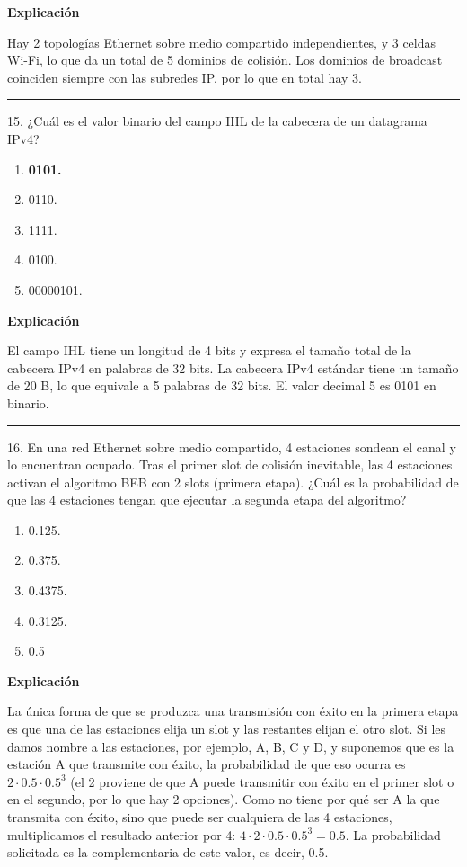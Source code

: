 \documentclass[10pt,a4paper]{article}
\begin{document}
\textbf{Explicación}

Hay 2 topologías Ethernet sobre medio compartido independientes, y 3 celdas Wi-Fi, lo que da un total de 5 dominios de colisión. Los dominios de broadcast coinciden siempre con las subredes IP, por lo que en total hay 3.

\vspace{15pt} \hrule \vspace{15pt}





15. ¿Cuál es el valor binario del campo IHL de la cabecera de un datagrama IPv4?


\begin{enumerate}[label=\alph*]
    \item \textbf{0101.}
    \item 0110.
    \item 1111.
    \item 0100.
    \item 00000101.
\end{enumerate}

\textbf{Explicación}

El campo IHL tiene un longitud de 4 bits y expresa el tamaño total de la cabecera IPv4 en palabras de 32 bits. La cabecera IPv4 estándar tiene un tamaño de 20 B, lo que equivale a 5 palabras de 32 bits. El valor decimal 5 es 0101 en binario.

\vspace{15pt} \hrule \vspace{15pt}




16.  En una red Ethernet sobre medio compartido, 4 estaciones sondean el canal y lo encuentran ocupado. Tras el primer slot de colisión inevitable, las 4 estaciones activan el algoritmo BEB con 2 slots (primera etapa). ¿Cuál es la probabilidad de que las 4 estaciones tengan que ejecutar la segunda etapa del algoritmo?

\begin{enumerate}[label=\alph*]
    \item 0.125.
    \item 0.375.
    \item 0.4375.
    \item 0.3125.
    \item 0.5
\end{enumerate}

\textbf{Explicación}

La única forma de que se produzca una transmisión con éxito en la primera etapa es que una de las estaciones
elija un slot y las restantes elijan el otro slot. Si les damos nombre a las estaciones, por ejemplo,
A, B, C y D, y suponemos que es la estación A que transmite con éxito, la probabilidad de que eso ocurra es
$2\cdot0.5\cdot0.5^3$ (el 2 proviene de que A puede transmitir con éxito en el primer slot o en el segundo,
por lo que hay 2 opciones). Como no tiene por qué ser A la que transmita con éxito, sino que puede ser
cualquiera de las 4 estaciones, multiplicamos el resultado anterior por 4: $4\cdot2\cdot0.5\cdot0.5^3 = 0.5$.
La probabilidad solicitada es la complementaria de este valor, es decir, 0.5.
\end{document}
